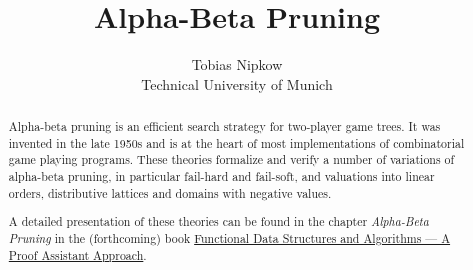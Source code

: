 \documentclass[11pt,a4paper]{report}
\begin{document}
\title{Alpha-Beta Pruning}
\author{Tobias Nipkow\\Technical University of Munich}
\maketitle

\begin{abstract}
Alpha-beta pruning is an efficient search strategy for two-player game trees.
It was invented in the late 1950s and is at the heart of most implementations
of combinatorial game playing programs. These theories formalize and verify a number of
variations of alpha-beta pruning, in particular fail-hard and fail-soft,
and valuations into linear orders, distributive lattices and domains with negative values.

A detailed presentation of these theories can be found in the chapter \emph{Alpha-Beta Pruning}
in the (forthcoming) book
\href{https://functional-algorithms-verified.org/functional_data_structures_algorithms.pdf}{Functional Data Structures and Algorithms --- A Proof Assistant Approach}.
\end{abstract}

{\renewcommand{\isanewline}{\\}

}


\newpage
\tableofcontents
\newpage


\end{document}
